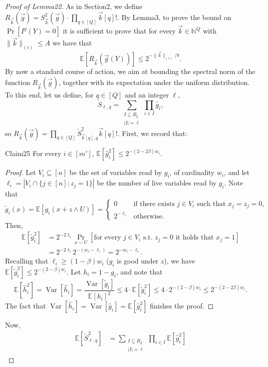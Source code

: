\begin{proof}[Proof of Lemma22]
As in Section2, we define $R_{\vec k}(\vec g)=S_{\vec k}^2(\vec g)\cdot\prod_{q\in[Q]}\vec k[q]!$.
By Lemma3, to prove the bound on $\Pr[I^g(Y)=0]$ it is sufficient to prove that for every $\vec k\in\mathbb N^Q$ with $\|\vec k\|_{(c)}\le A$ we have that
\[
\mathbb E[R_{\vec k}(\vec g(Y))]\le2^{-\|\vec k\|_{(c)}/8}.
\]
By now a standard course of action, we aim at bounding the spectral norm of the function $R_{\vec k}(\vec g)$, together with its expectation under the uniform distribution. To this end, let us define, for $q\in[Q]$ and an integer $\ell$,
\[
\check S_{\ell,q}=\sum_{\substack{I\subseteq B_q\\|I|=\ell}}\prod_{i\in I}\widehat g_i,
\]
so $R_{\vec k}(\vec g)=\prod_{q\in[Q]}\check S_{\vec k[q],q}^2\vec k[q]!$. First, we record that:
\begin{authorclaim}{Claim25}
For every $i\in[m']$, $\mathbb E[\widehat g_i^2]\le2^{-(2-2\beta)w_i}$.
\end{authorclaim}
\begin{proof}
Let $V_i\subseteq[n]$ be the set of variables read by $g_i$, of cardinality $w_i$, and let $\ell_i=|V_i\cap\{j\in[n]:z_j=1\}|$ be the number of live variables read by $g_i$. Note that
\[
\widetilde g_i(x)=\mathbb E[g_i(x+z\wedge U)]
=\begin{cases}0&\text{if there exists }j\in V_i\text{ such that }x_j=z_j=0,\\2^{-\ell_i}&\text{otherwise}.\end{cases}
\]
Then,
\begin{align*}
\mathbb E[\widetilde g_i^2]
&=2^{-2\ell_i}\Pr_{x\sim U}[\text{for every }j\in V_i\text{ s.t. }z_j=0\text{ it holds that }x_j=1]\\
&=2^{-2\ell_i}2^{-(w_i-\ell_i)}=2^{-w_i-\ell_i}.
\end{align*}
Recalling that $\ell_i\ge(1-\beta)w_i$ ($g_i$ is good under $z$), we have $\mathbb E[\widetilde g_i^2]\le2^{-(2-\beta)w_i}$. Let $h_i=1-g_i$, and note that
\[
\mathbb E[\widehat h_i^2]=\operatorname{Var}[\widehat h_i]
=\frac{\operatorname{Var}[\widetilde g_i]}{\mathbb E[h_i]^2}
\le4\cdot\mathbb E[\widetilde g_i^2]\le4\cdot2^{-(2-\beta)w_i}
\le2^{-(2-2\beta)w_i}.
\]
The fact that $\operatorname{Var}[\widehat h_i]=\operatorname{Var}[\widehat g_i]=\mathbb E[\widehat g_i^2]$ finishes the proof.
\end{proof}
Now,
\begin{align*}
\mathbb E[\check S_{\ell,q}^2]
&=\sum_{\substack{I\subseteq B_q\\|I|=\ell}}\prod_{i\in I}\mathbb E[\widehat g_i^2]

\end{align*}
\end{proof}
